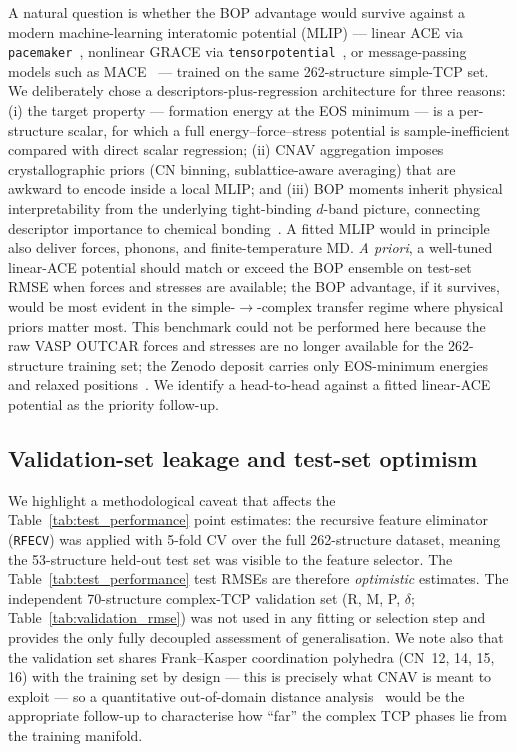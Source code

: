 A natural question is whether the BOP advantage would survive against a modern machine-learning interatomic potential (MLIP) --- linear ACE via \texttt{pacemaker}~\cite{pacemaker}, nonlinear GRACE via \texttt{tensorpotential}~\cite{grace}, or message-passing models such as MACE~\cite{mace} --- trained on the same 262-structure simple-TCP set. We deliberately chose a descriptors-plus-regression architecture for three reasons: (i) the target property --- formation energy at the EOS minimum --- is a per-structure scalar, for which a full energy--force--stress potential is sample-inefficient compared with direct scalar regression; (ii) CNAV aggregation imposes crystallographic priors (CN binning, sublattice-aware averaging) that are awkward to encode inside a local MLIP; and (iii) BOP moments inherit physical interpretability from the underlying tight-binding $d$-band picture, connecting descriptor importance to chemical bonding~\cite{hammerschmidt_2008,hammerschmidt_2013}. A fitted MLIP would in principle also deliver forces, phonons, and finite-temperature MD. \emph{A priori}, a well-tuned linear-ACE potential should match or exceed the BOP ensemble on test-set RMSE when forces and stresses are available; the BOP advantage, if it survives, would be most evident in the simple-$\to$-complex transfer regime where physical priors matter most. This benchmark could not be performed here because the raw VASP OUTCAR forces and stresses are no longer available for the 262-structure training set; the Zenodo deposit carries only EOS-minimum energies and relaxed positions~\cite{zenodo}. We identify a head-to-head against a fitted linear-ACE potential as the priority follow-up.

\subsection{Validation-set leakage and test-set optimism}

We highlight a methodological caveat that affects the Table~\ref{tab:test_performance} point estimates: the recursive feature eliminator (\texttt{RFECV}) was applied with 5-fold CV over the full 262-structure dataset, meaning the 53-structure held-out test set was visible to the feature selector. The Table~\ref{tab:test_performance} test RMSEs are therefore \emph{optimistic} estimates. The independent 70-structure complex-TCP validation set (R, M, P, $\delta$; Table~\ref{tab:validation_rmse}) was not used in any fitting or selection step and provides the only fully decoupled assessment of generalisation. We note also that the validation set shares Frank--Kasper coordination polyhedra (CN~12, 14, 15, 16) with the training set by design --- this is precisely what CNAV is meant to exploit --- so a quantitative out-of-domain distance analysis~\cite{janet_kulik_2017,sutton_2020} would be the appropriate follow-up to characterise how ``far'' the complex TCP phases lie from the training manifold.

